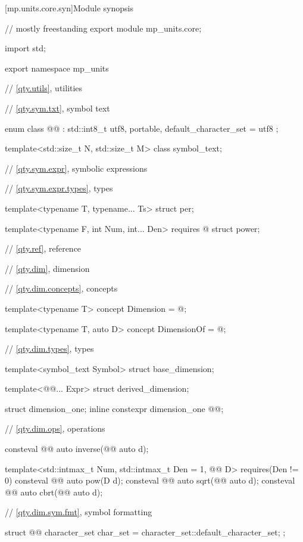 [mp.units.core.syn]{Module  synopsis}
%
\begin{codeblock}
// mostly freestanding
export module mp_units.core;

import std;

export namespace mp_units {

// \ref{qty.utils}, utilities

// \ref{qty.sym.txt}, symbol text

enum class @@ : std::int8_t { utf8, portable, default_character_set = utf8 };

template<std::size_t N, std::size_t M>
class symbol_text;

// \ref{qty.sym.expr}, symbolic expressions

// \ref{qty.sym.expr.types}, types

template<typename T, typename... Ts>
struct per;

template<typename F, int Num, int... Den>
  requires @\seebelownc@
struct power;

// \ref{qty.ref}, reference

// \ref{qty.dim}, dimension

// \ref{qty.dim.concepts}, concepts

template<typename T>
concept Dimension = @\seebelownc@;

template<typename T, auto D>
concept DimensionOf = @\seebelownc@;

// \ref{qty.dim.types}, types

template<symbol_text Symbol>
struct base_dimension;

template<@@... Expr>
struct derived_dimension;

struct dimension_one;
inline constexpr dimension_one @@{};

// \ref{qty.dim.ops}, operations

consteval @@ auto inverse(@@ auto d);

template<std::intmax_t Num, std::intmax_t Den = 1, @@ D>
  requires(Den != 0)
consteval @@ auto pow(D d);
consteval @@ auto sqrt(@@ auto d);
consteval @@ auto cbrt(@@ auto d);

// \ref{qty.dim.sym.fmt}, symbol formatting

struct @@ {
  character_set char_set = character_set::default_character_set;
};

}
\end{codeblock}
